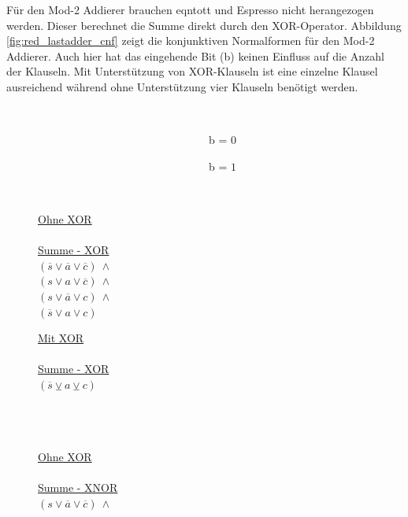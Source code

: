 Für den Mod-2 Addierer brauchen eqntott und Espresso nicht herangezogen werden. Dieser berechnet die Summe direkt durch den XOR-Operator.
Abbildung \ref{fig:red_lastadder_cnf} zeigt die konjunktiven Normalformen für den Mod-2 Addierer. Auch hier hat das eingehende Bit (b)
keinen Einfluss auf die Anzahl der Klauseln. Mit Unterstützung von XOR-Klauseln ist eine einzelne Klausel ausreichend während ohne
Unterstützung vier Klauseln benötigt werden.
\begin{figure}[!h]
  \centering
  \begin{minipage}[c]{0.3cm}
    ~
  \end{minipage}
  \begin{minipage}[c]{7.1cm}
    ~~~~~~~~~~~~~~~~~~~~~~~~~~~~~~~b = $0$
  \end{minipage}
  \begin{minipage}[c]{7cm}
    ~~~~~~~~~~~~~~~~~~~~~~~~~~~~~~~b = $1$
  \end{minipage}
  \begin{minipage}[l]{0.4cm}
    ~
  \end{minipage}
  \begin{minipage}[l]{3.5cm}
    \underline{Ohne XOR}\\
    ~\\
    \underline{Summe - XOR}\\
    $ (\overline{s} \vee \overline{a} \vee \overline{c}) ~ \wedge $\\
    $ (s \vee a \vee \overline{c}) ~ \wedge $\\
    $ (s \vee \overline{a} \vee c) ~ \wedge $\\
    $ (\overline{s} \vee a \vee c) $
  \end{minipage}
  \begin{minipage}[l]{3.5cm}
    \underline{Mit XOR}\\
    ~\\
    \underline{Summe - XOR}\\
    $ (\overline{s} \veebar a \veebar c) $\\
    ~\\
    ~\\
    ~
  \end{minipage}
  \begin{minipage}[l]{3.5cm}
    \underline{Ohne XOR}\\
    ~\\
    \underline{Summe - XNOR}\\
    $ (s \vee \overline{a} \vee \overline{c}) ~ \wedge $\\

\end{minipage}
\end{figure}
